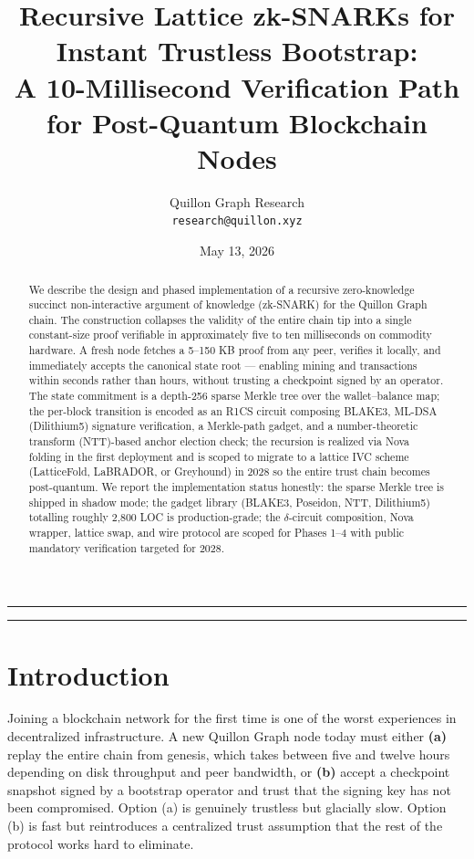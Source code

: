 \documentclass[11pt,a4paper]{article}
\title{Recursive Lattice zk-SNARKs for Instant Trustless Bootstrap:\\
       A 10-Millisecond Verification Path for Post-Quantum Blockchain Nodes}
\author{Quillon Graph Research\\
        \texttt{research@quillon.xyz}}
\date{May 13, 2026}
\begin{document}
\maketitle

\begin{abstract}
\noindent
We describe the design and phased implementation of a recursive zero-knowledge succinct
non-interactive argument of knowledge (zk-SNARK) for the Quillon Graph chain. The
construction collapses the validity of the entire chain tip into a single constant-size
proof verifiable in approximately five to ten milliseconds on commodity hardware.
A fresh node fetches a 5--150 KB proof from any peer, verifies it locally,
and immediately accepts the canonical state root --- enabling mining and transactions
within seconds rather than hours, without trusting a checkpoint signed by an operator.
The state commitment is a depth-256 sparse Merkle tree over the wallet--balance map;
the per-block transition is encoded as an R1CS circuit composing BLAKE3,
ML-DSA (Dilithium5) signature verification, a Merkle-path gadget, and a number-theoretic
transform (NTT)-based anchor election check; the recursion is realized via Nova
folding in the first deployment and is scoped to migrate to a lattice IVC scheme
(LatticeFold, LaBRADOR, or Greyhound) in 2028 so the entire trust chain becomes
post-quantum. We report the implementation status honestly: the sparse Merkle tree
is shipped in shadow mode; the gadget library (BLAKE3, Poseidon, NTT, Dilithium5)
totalling roughly 2{,}800 LOC is production-grade; the $\delta$-circuit composition,
Nova wrapper, lattice swap, and wire protocol are scoped for Phases 1--4 with public
mandatory verification targeted for 2028.
\end{abstract}

\vspace{1em}
\noindent\rule{\linewidth}{0.4pt}
\tableofcontents
\noindent\rule{\linewidth}{0.4pt}
\vspace{0.5em}

\section{Introduction}
\label{sec:intro}

Joining a blockchain network for the first time is one of the worst experiences in
decentralized infrastructure. A new Quillon Graph node today must either
\textbf{(a)} replay the entire chain from genesis, which takes between five and
twelve hours depending on disk throughput and peer bandwidth, or \textbf{(b)} accept
a checkpoint snapshot signed by a bootstrap operator and trust that the signing key
has not been compromised. Option (a) is genuinely trustless but glacially slow.
Option (b) is fast but reintroduces a centralized trust assumption that the rest of
the protocol works hard to eliminate.
\end{document}
